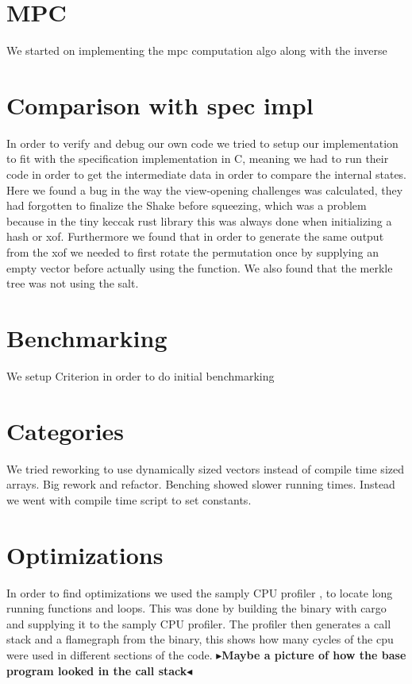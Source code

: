 \documentclass[twoside,11pt,openright]{report}
\theoremstyle{definition}
\theoremstyle{plain}
\newcommand{\todo}[1]{{\color[rgb]{.5,0,0}\textbf{$\blacktriangleright$#1$\blacktriangleleft$}}}
\begin{document}
\section{MPC}\label{sub:mpc_algo}
We started on implementing the mpc computation algo along with the inverse

\section{Comparison with spec impl}\label{sub:comparison_with_spec_impl}
In order to verify and debug our own code we tried to setup our implementation to fit with the specification implementation in C, meaning we had to run their code in order to get the intermediate data in order to compare the internal states.
Here we found a bug in the way the view-opening challenges was calculated, they had forgotten to finalize the Shake before squeezing, which was a problem because in the tiny keccak rust library this was always done when initializing a hash or xof.
Furthermore we found that in order to generate the same output from the xof we needed to first rotate the permutation once by supplying an empty vector before actually using the function.
We also found that the merkle tree was not using the salt.

\section{Benchmarking}\label{sub:benchmarking} %
We setup Criterion in order to do initial benchmarking


\section{Categories}\label{sub:categories} %

We tried reworking to use dynamically sized vectors instead of compile time sized arrays. Big rework and refactor. Benching showed slower running times. Instead we went with compile time script to set constants.


\section{Optimizations}
In order to find optimizations we used the samply CPU profiler \cite{Stange2024mstange}, to locate long running functions and loops. This was done by building the binary with cargo and supplying it to the samply CPU profiler. The profiler then generates a call stack and a flamegraph from the binary, this shows how many cycles of the cpu were used in different sections of the code. 
\todo{Maybe a picture of how the base program looked in the call stack}
\end{document}
